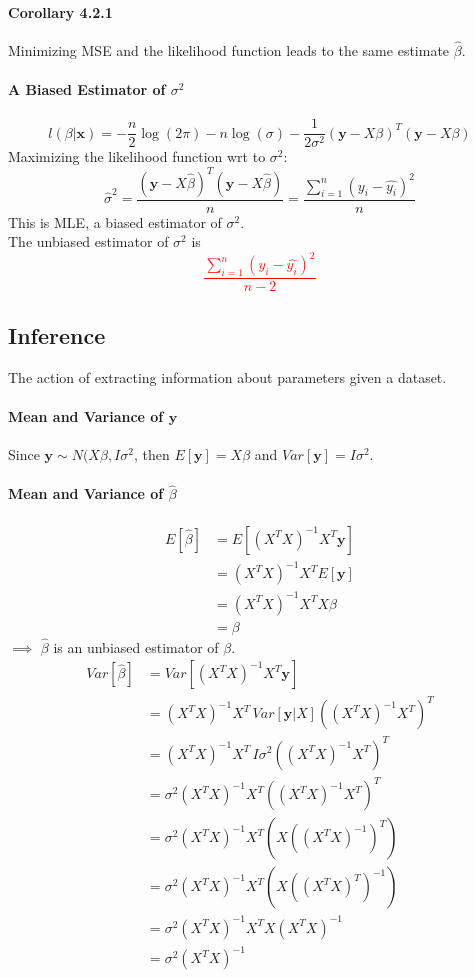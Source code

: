 \documentclass[11pt]{article}
\newcommand{\tb}[1]{\textbf{#1}}
\newcommand{\vx}[0]{\tb{x}}
\newcommand{\vy}[0]{\tb{y}}
\begin{document}
\paragraph{Corollary 4.2.1}
Minimizing MSE and the likelihood function leads to the same estimate $\hat{\beta}$.
\paragraph{A Biased Estimator of $\sigma^2$}
$$l(\beta | \vx) = -\frac{n}{2}\log(2\pi) - n\log(\sigma) - \frac{1}{2\sigma^2} (\vy - X \beta)^T(\vy - X\beta)$$
Maximizing the likelihood function wrt to $\sigma^2$:
$${\hat{\sigma}}^2 = \frac{(\vy - X\hat{\beta})^T(\vy-X\hat{\beta})}{n} = \frac{\sum_{i=1}^n(y_i-\hat{y_i})^2}{n}$$
This is MLE, a biased estimator of $\sigma^2$. \\
The unbiased estimator of $\sigma^2$ is \textcolor{red}{$$\frac{\sum_{i=1}^n(y_i-\hat{y_i})^2}{n-2}$$}
\subsection{Inference}
The action of extracting information about parameters given a dataset.\\
\paragraph{Mean and Variance of $\vy$}
Since $\vy \sim N(X\beta, I\sigma^2$, then $E[\vy] = X\beta$ and $Var[\vy] = I\sigma^2$.
\paragraph{Mean and Variance of $\hat{\beta}$}
\begin{align*}
    E[\hat{\beta}] &= E[(X^TX)^{-1}X^T\vy]\\
    &= (X^TX)^{-1}X^TE[\vy]\\
    &= (X^TX)^{-1}X^TX\beta \\
    &= \beta
\end{align*}
$\implies$ $\hat{\beta}$ is an unbiased estimator of $\beta$.
\begin{align*}
    Var[\hat{\beta}] &= Var[(X^TX)^{-1}X^T\vy]\\
    &= (X^TX)^{-1}X^T \, Var[\vy|X]((X^TX)^{-1}X^T)^T\\
    &= (X^TX)^{-1}X^T \, I\sigma^2 ((X^TX)^{-1}X^T)^T \\
    &= \sigma^2 (X^TX)^{-1}X^T((X^TX)^{-1}X^T)^T \\
    &= \sigma^2 (X^TX)^{-1}X^T(X((X^TX)^{-1})^T)\\
    &= \sigma^2 (X^TX)^{-1}X^T(X((X^TX)^{T})^{-1})\\
    &= \sigma^2 (X^TX)^{-1}X^TX(X^TX)^{-1}\\
    &= \sigma^2 (X^TX)^{-1}
\end{align*}
\end{document}
